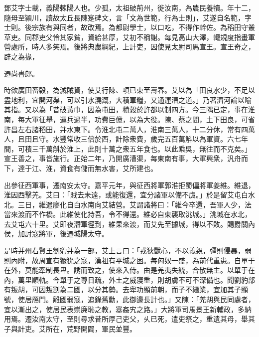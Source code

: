 \begin{pinyinscope}
 
 
 鄧艾字士載，義陽棘陽人也。少孤，太祖破荊州，徙汝南，為農民養犢。年十二，隨母至潁川，讀故太丘長陳寔碑文，言「文為世範，行為士則」，艾遂自名範，字士則。後宗族有與同者，故改焉。為都尉學士，以口吃，不得作幹佐。為稻田守叢草吏。同郡吏父怜其家貧，資給甚厚，艾初不稱謝。每見高山大澤，輙規度指畫軍營處所，時人多笑焉。後將典農綱紀，上計吏，因使見太尉司馬宣王。宣王奇之，辟之為掾，
 
 
 遷尚書郎。
 
 
 
 
 時欲廣田畜糓，為滅賊資，使艾行陳、項已東至壽春。艾以為「田良水少，不足以盡地利，宜開河渠，可以引水澆溉，大積軍糧，又通運漕之道。」乃著濟河論以喻其指。又以為「昔破黃巾，因為屯田，積穀於許都以制四方。今三隅已定，事在淮南，每大軍征舉，運兵過半，功費巨億，以為大役。陳、蔡之間，土下田良，可省許昌左右諸稻田，并水東下。令淮北屯二萬人，淮南三萬人，十二分休，常有四萬人，且田且守。水豐常收三倍於西，計除衆費，歲完五百萬斛以為軍資。六七年間，可積三千萬斛於淮上，此則十萬之衆五年食也。以此乘吳，無往而不克矣。」宣王善之，事皆施行。正始二年，乃開廣漕渠，每東南有事，大軍興衆，汎舟而下，達于江、淮，資食有儲而無水害，艾所建也。
 
 
 
 
 出參征西軍事，遷南安太守。嘉平元年，與征西將軍郭淮拒蜀偏將軍姜維。維退，淮因西擊羌。艾曰：「賊去未遠，或能復還，宜分諸軍以備不虞。」於是留艾屯白水北。三日，維遣廖化自白水南向艾結營。艾謂諸將曰：「維今卒還，吾軍人少，法當來渡而不作橋。此維使化持吾，令不得還。維必自東襲取洮城。」洮城在水北，去艾屯六十里。艾即夜潛軍徑到，維果來渡，而艾先至據城，得以不敗。賜爵關內侯，加討寇將軍，後遷城陽太守。
 
 
 
 
 是時并州右賢王劉豹并為一部，艾上言曰：「戎狄獸心，不以義親，彊則侵暴，弱則內附，故周宣有玁狁之寇，漢祖有平城之困。每匈奴一盛，為前代重患。自單于在外，莫能牽制長卑。誘而致之，使來入侍。由是羌夷失統，合散無主。以單于在內，萬里順軌。今單于之尊日疏，外土之威寖重，則胡虜不可不深備也。聞劉豹部有叛胡，可因叛割為二國，以分其勢。去卑功顯前朝，而子不繼業，宜加其子顯號，使居鴈門。離國弱寇，追錄舊勳，此御邊長計也。」又陳：「羌胡與民同處者，宜以漸出之，使居民表崇廉恥之教，塞姦宄之路。」大將軍司馬景王新輔政，多納用焉。遷汝南太守，至則尋求昔所厚己吏父，乆已死，遣吏祭之，重遺其母，舉其子與計吏。艾所在，荒野開闢，軍民並豐。
 

\end{pinyinscope}
